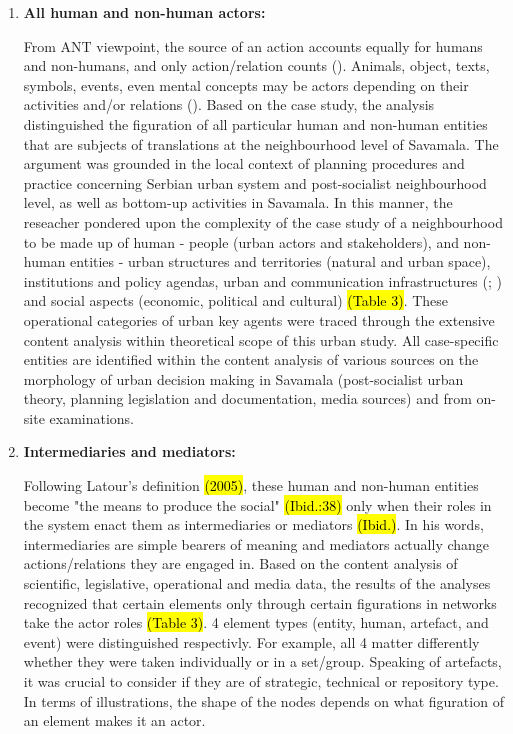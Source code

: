 \documentclass[11pt]{report}
\begin{document}
\begin{enumerate}
\item \textbf{All human and non-human actors:}

From ANT viewpoint, the source of an action accounts equally for humans and non-humans, and only action/relation counts (\cite{Latour 1996}). Animals, object, texts, symbols, events, even mental concepts may be actors depending on their activities and/or relations (\cite{Cerulo 2009}).
Based on the case study, the analysis distinguished the figuration of all particular human and non-human entities that are subjects of translations at the neighbourhood level of Savamala. The argument was grounded in the local context of planning procedures and practice concerning Serbian urban system and post-socialist neighbourhood level, as well as bottom-up activities in Savamala. In this manner, the reseacher pondered upon the complexity of the case study of a neighbourhood to be made up of human - people (urban actors and stakeholders), and non-human entities - urban structures and territories (natural and urban space), institutions and policy agendas, urban and communication infrastructures (\cite{Mitchell 1999}; \cite{Firmino et al., 2008}) and social aspects (economic, political and cultural) \hl{(Table 3)}. These operational categories of urban key agents were traced through the extensive content analysis within theoretical scope of this urban study. All case-specific entities are identified within the content analysis of various sources on the morphology of urban decision making in Savamala (post-socialist urban theory, planning legislation and documentation, media sources) and from on-site examinations.

\item \textbf{Intermediaries and mediators:}

Following Latour’s definition \hl{(2005)}, these human and non-human entities become "the means to produce the social" \hl{(Ibid.:38)} only when their roles in the system enact them as intermediaries or mediators \hl{(Ibid.)}. In his words, intermediaries are simple bearers of meaning and mediators actually change actions/relations they are engaged in.
Based on the content analysis of scientific, legislative, operational and media data, the results of the analyses recognized that certain elements only through certain figurations in networks take the actor roles \hl{(Table 3)}. 4 element types (entity, human, artefact, and event) were distinguished respectivly. For example, all 4 matter differently whether they were taken individually or in a set/group. Speaking of artefacts, it was crucial to consider if they are of strategic, technical or repository type. In terms of illustrations, the shape of the nodes depends on what figuration of an element makes it an actor.


\end{enumerate}
\end{document}
